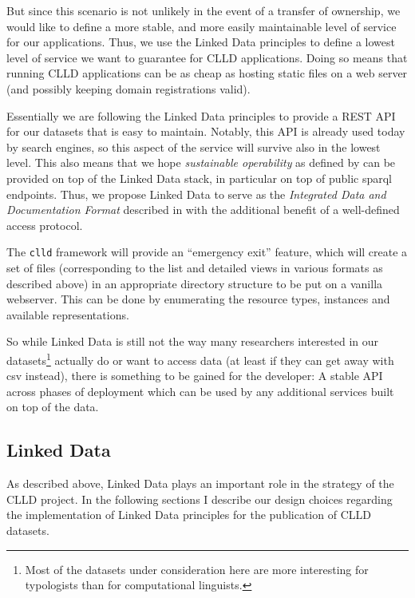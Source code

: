 \documentclass[a4paper,10pt]{article}
\begin{document}
But since this scenario is not unlikely in the event of a transfer of ownership, we would
like to define a more stable, and more easily maintainable level of service for our
applications. Thus, we use the Linked Data principles to define a lowest level of service we
want to guarantee for CLLD applications. Doing so means that running CLLD applications can
be as cheap as hosting static files on a web server (and possibly keeping domain
registrations valid).

Essentially we are following the Linked Data principles to provide a REST API for our
datasets that is easy to maintain. Notably, this API is already used today by search engines,
so this aspect of the service will survive also in the lowest level. This also means that
we hope \emph{sustainable operability} as defined by  can be
provided on top of the Linked Data stack, in particular on top of public sparql endpoints.
Thus, we propose Linked Data to serve as the \emph{Integrated Data and Documentation Format}
described in  with the additional benefit of a well-defined access protocol.

The \texttt{clld} framework will provide an ``emergency exit'' feature, which will create
a set of files (corresponding to the list and detailed views in various formats as described
above) in an appropriate directory structure to be put on a vanilla webserver.
This can be done by enumerating the resource types, instances and available representations.


So while Linked Data is still not the way many researchers interested in our datasets\footnote{Most of
the datasets under consideration here are more interesting for typologists than for computational
linguists.}
actually do or want to access data (at least if they can get away with csv instead), there is
something to be gained for the
developer: A stable API across phases of deployment which can be used by any additional services
built on top of the data.


\subsection{Linked Data}

As described above, Linked Data plays an important role in the strategy of the CLLD project.
In the following sections I describe our design choices regarding the implementation of Linked
Data principles for the publication of CLLD datasets.
\end{document}

